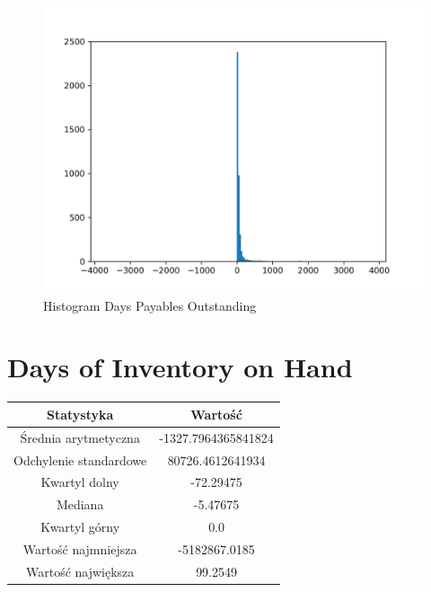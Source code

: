 \documentclass{article}
\begin{document}
\begin{figure}[h!]
    \includegraphics[width=\linewidth]{variables/Days Payables Outstanding.png}
    \caption{Histogram Days Payables Outstanding }
\end{figure}\section{ Days of Inventory on Hand }

\begin{center}
    \begin{tabular}{|c | c|} 
    \hline
    Statystyka & Wartość \\
    \hline\hline
    Średnia arytmetyczna & -1327.7964365841824 \\ 
    \hline
    Odchylenie standardowe & 80726.4612641934 \\
    \hline
    Kwartyl dolny & -72.29475 \\
    \hline
    Mediana & -5.47675 \\
    \hline
    Kwartyl górny & 0.0 \\
    \hline
    Wartość najmniejsza & -5182867.0185 \\
    \hline
    Wartość największa & 99.2549 \\
    \hline
   \end{tabular}
\end{center}
\end{document}
